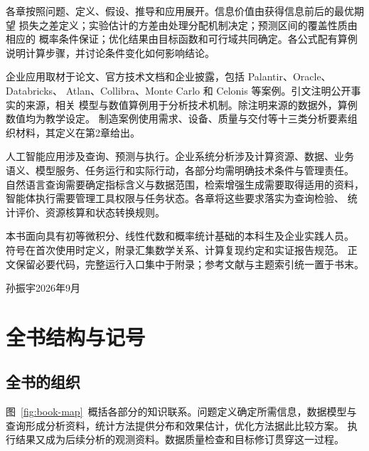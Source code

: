 各章按照问题、定义、假设、推导和应用展开。信息价值由获得信息前后的最优期望
损失之差定义；实验估计的方差由处理分配机制决定；预测区间的覆盖性质由相应的
概率条件保证；优化结果由目标函数和可行域共同确定。各公式配有算例说明计算步骤，并讨论条件变化如何影响结论。

企业应用取材于论文、官方技术文档和企业披露，包括 Palantir、Oracle、Databricks、
Atlan、Collibra、Monte Carlo 和 Celonis 等案例。引文注明公开事实的来源，相关
模型与数值算例用于分析技术机制。除注明来源的数据外，算例数值均为教学设定。
制造案例使用需求、设备、质量与交付等十三类分析要素组织材料，其定义在第2章给出。

人工智能应用涉及查询、预测与执行。企业系统分析涉及计算资源、数据、业务
语义、模型服务、任务运行和实际行动，各部分均需明确技术条件与管理责任。
自然语言查询需要确定指标含义与数据范围，检索增强生成需要取得适用的资料，
智能体执行需要管理工具权限与任务状态。各章将这些要求落实为查询检验、
统计评价、资源核算和状态转换规则。

本书面向具有初等微积分、线性代数和概率统计基础的本科生及企业实践人员。
符号在首次使用时定义，附录汇集数学关系、计算复现约定和实证报告规范。
正文保留必要代码，完整运行入口集中于附录；参考文献与主题索引统一置于书末。

\begin{flushright}
孙振宇\qquad 2026年9月
\end{flushright}
\endgroup

\chapter*{全书结构与记号}

\section*{全书的组织}
图~\ref{fig:book-map}~概括各部分的知识联系。问题定义确定所需信息，数据模型与
查询形成分析资料，统计方法提供分布和效果估计，优化方法据此比较方案。
执行结果又成为后续分析的观测资料。数据质量检查和目标修订贯穿这一过程。

